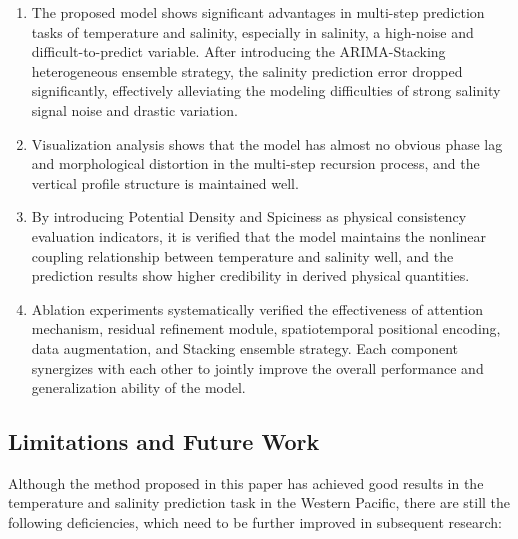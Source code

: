 \documentclass[webpdf,contemporary,large]{oup-authoring-template}
\begin{document}
\begin{enumerate}
\renewcommand{\labelenumi}{\alph{enumi})}
\item The proposed model shows significant advantages in multi-step prediction tasks of temperature and salinity, especially in salinity, a high-noise and difficult-to-predict variable. After introducing the ARIMA-Stacking heterogeneous ensemble strategy, the salinity prediction error dropped significantly, effectively alleviating the modeling difficulties of strong salinity signal noise and drastic variation.

\item Visualization analysis shows that the model has almost no obvious phase lag and morphological distortion in the multi-step recursion process, and the vertical profile structure is maintained well.

\item By introducing Potential Density and Spiciness as physical consistency evaluation indicators, it is verified that the model maintains the nonlinear coupling relationship between temperature and salinity well, and the prediction results show higher credibility in derived physical quantities.

\item Ablation experiments systematically verified the effectiveness of attention mechanism, residual refinement module, spatiotemporal positional encoding, data augmentation, and Stacking ensemble strategy. Each component synergizes with each other to jointly improve the overall performance and generalization ability of the model.
\end{enumerate}

\subsection{Limitations and Future Work}

Although the method proposed in this paper has achieved good results in the temperature and salinity prediction task in the Western Pacific, there are still the following deficiencies, which need to be further improved in subsequent research:
\end{document}
